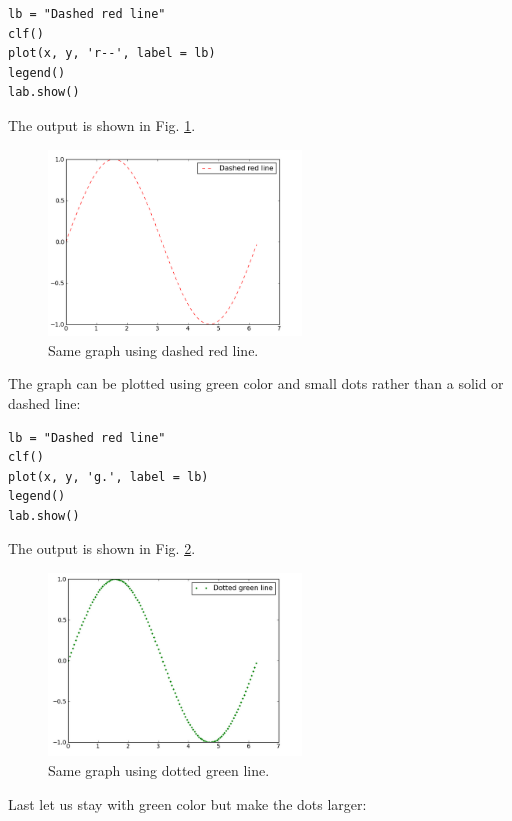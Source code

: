 \documentclass[article,A4,12pt]{llncs}
\begin{document}
\begin{verbatim}
lb = "Dashed red line"
clf()
plot(x, y, 'r--', label = lb)
legend()
lab.show()
\end{verbatim}
The output is shown in Fig. \ref{fig:plot3}.



\begin{figure}[!ht]
\begin{center}
\includegraphics[width=0.6\textwidth]{img/plot3.png}
\end{center}
\vspace{-2mm}
\caption{Same graph using dashed red line.}
\label{fig:plot3}
\end{figure}
\noindent
The graph can be plotted using green color and small dots rather than 
a solid or dashed line:

\begin{verbatim}
lb = "Dashed red line"
clf()
plot(x, y, 'g.', label = lb)
legend()
lab.show()
\end{verbatim}
The output is shown in Fig. \ref{fig:plot4}.

\newpage

\begin{figure}[!ht]
\begin{center}
\includegraphics[width=0.6\textwidth]{img/plot4.png}
\end{center}
\vspace{-6mm}
\caption{Same graph using dotted green line.}
\label{fig:plot4}
\vspace{-5mm}
\end{figure}
\noindent
Last let us stay with green color but make the dots larger:
\end{document}
